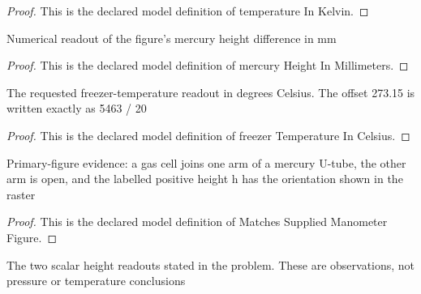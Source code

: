 \begin{proof}
  This is the declared model definition of temperature In Kelvin.
\end{proof}
\begin{definition}
  \label{def:physics:phyx-mini-0365:phyxminiproblems-problemphyxmini0365-mercuryheightinmillimeters}
  Numerical readout of the figure's mercury height difference in mm
\end{definition}
\begin{proof}
  This is the declared model definition of mercury Height In Millimeters.
\end{proof}
\begin{definition}
  \label{def:physics:phyx-mini-0365:phyxminiproblems-problemphyxmini0365-freezertemperatureincelsius}
  The requested freezer-temperature readout in degrees Celsius. The offset 273.15 is written exactly as 5463 / 20
\end{definition}
\begin{proof}
  This is the declared model definition of freezer Temperature In Celsius.
\end{proof}
\begin{definition}
  \label{def:physics:phyx-mini-0365:phyxminiproblems-problemphyxmini0365-matchessuppliedmanometerfigure}
  Primary-figure evidence: a gas cell joins one arm of a mercury U-tube, the other arm is open, and the labelled positive height h has the orientation shown in the raster
\end{definition}
\begin{proof}
  This is the declared model definition of Matches Supplied Manometer Figure.
\end{proof}
\begin{definition}
  \label{def:physics:phyx-mini-0365:phyxminiproblems-problemphyxmini0365-matchessuppliedheightreadouts}
  The two scalar height readouts stated in the problem. These are observations, not pressure or temperature conclusions
\end{definition}

